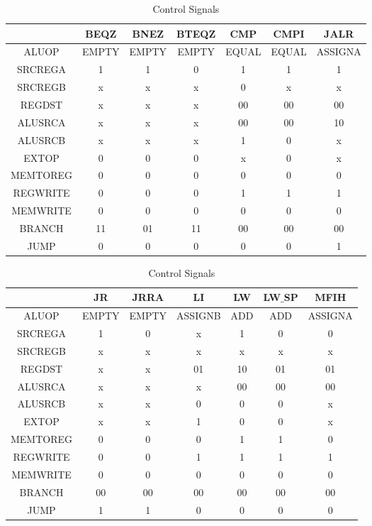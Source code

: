 \begin{center}
\begin{table}[H]
\caption{Control Signals}
\label{tab:treatments}
\begin{tabular}{|c|cccccc|}
\hline
& BEQZ & BNEZ & BTEQZ & CMP & CMPI & JALR \\
\hline
ALUOP & EMPTY & EMPTY & EMPTY & EQUAL & EQUAL & ASSIGNA\\	
\hline
SRCREGA & 1 & 1 & 0 & 1 & 1 & 1\\
\hline
SRCREGB & x & x & x & 0 & x & x\\
\hline
REGDST & x & x & x & 00 & 00 & 00\\
\hline
ALUSRCA & x & x & x & 00 & 00 & 10\\
\hline
ALUSRCB & x & x & x & 1 & 0 & x\\
\hline
EXTOP & 0 & 0 & 0 & x & 0 & x\\
\hline
MEMTOREG & 0 & 0 & 0 & 0 & 0 & 0\\
\hline
REGWRITE & 0 & 0 & 0 & 1 & 1 & 1\\
\hline
MEMWRITE & 0 & 0 & 0 & 0 & 0 & 0\\
\hline
BRANCH & 11 & 01 & 11 & 00 & 00 & 00\\
\hline
JUMP & 0 & 0 & 0 & 0 & 0 & 1\\
\hline
\end{tabular}
\end{table}
\end{center}

\begin{center}
\begin{table}[H]
\caption{Control Signals}
\label{tab:treatments}
\begin{tabular}{|c|cccccc|}
\hline
& JR & JRRA & LI & LW & LW$\_$SP & MFIH \\
\hline
ALUOP & EMPTY & EMPTY & ASSIGNB & ADD & ADD & ASSIGNA\\	
\hline
SRCREGA & 1 & 0 & x & 1 & 0 & 0\\
\hline
SRCREGB & x & x & x & x & x & x\\
\hline
REGDST & x & x & 01 & 10 & 01 & 01\\
\hline
ALUSRCA & x & x & x & 00 & 00 & 00\\
\hline
ALUSRCB & x & x & 0 & 0 & 0 & x\\
\hline
EXTOP & x & x & 1 & 0 & 0 & x\\
\hline
MEMTOREG & 0 & 0 & 0 & 1 & 1 & 0\\
\hline
REGWRITE & 0 & 0 & 1 & 1 & 1 & 1\\
\hline
MEMWRITE & 0 & 0 & 0 & 0 & 0 & 0\\
\hline
BRANCH & 00 & 00 & 00 & 00 & 00 & 00\\
\hline
JUMP & 1 & 1 & 0 & 0 & 0 & 0\\
\hline
\end{tabular}
\end{table}
\end{center}

